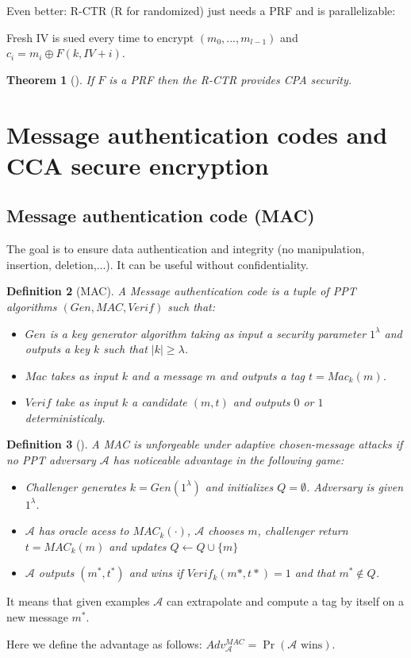 \documentclass{article}
\newtheorem{thm}{Theorem}[section]
\newtheorem{defi}[thm]{Definition}
\newcommand{\Thm}[3]{\begin{thm}[#1]\label{#2}#3\end{thm}}
\newcommand{\Def}[3]{\begin{defi}[#1]\label{#2}#3\end{defi}}
\newcommand{\A}{\mathcal{A}}
\begin{document}
Even better: R-CTR (R for randomized) just needs a PRF and is parallelizable:

Fresh IV is sued every time to encrypt $(m_0,...,m_{l-1})$ and $c_i=m_i\oplus F(k,IV+i)$.

\Thm{}{def:RCTRsecure}{If $F$ is a PRF then the R-CTR provides CPA security.}

\section{Message authentication codes and CCA secure encryption}
\subsection{Message authentication code (MAC)}
The goal is to ensure data authentication and integrity (no manipulation, insertion, deletion,...). It can be useful without confidentiality.

\Def{MAC}{def:MAC}{A Message authentication code is a tuple of PPT algorithms $(Gen,MAC,Verif)$ such that:\begin{itemize}
\item $Gen$ is a key generator algorithm taking as input a security parameter $1^\lambda$ and outputs a key $k$ such that $|k|\geq\lambda$.
\item $Mac$ takes as input $k$ and a message $m$ and outputs a tag $t=Mac_k(m)$.
\item $Verif$ take as input $k$ a candidate $(m,t)$ and outputs $0$ or $1$ deterministicaly.
\end{itemize}}

\Def{}{def:unforgeadapt}{A MAC is unforgeable under adaptive chosen-message attacks if no PPT adversary $\A$ has noticeable advantage in the following game:\begin{itemize}
\item Challenger generates $k=Gen(1^\lambda)$ and initializes $Q=\emptyset$. Adversary is given $1^\lambda$.
\item $\A$ has oracle acess to $MAC_k(\cdot)$, $\A$ chooses $m$, challenger return $t=MAC_k(m)$ and updates $Q\leftarrow Q\cup\{m\}$
\item $\A$ outputs $(m^*,t^*)$ and wins if $Verif_k(m*,t*)=1$ and that $m^*\notin Q$.
\end{itemize}}

It means that given examples $\A$ can extrapolate and compute a tag by itself on a new message $m^*$.

Here we define the advantage as follows: $Adv_\A^{MAC}=\Pr(\A\text{ wins})$.
\end{document}
